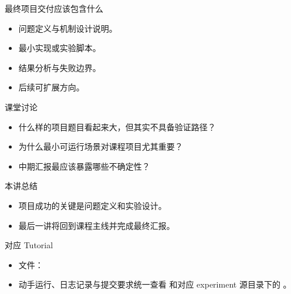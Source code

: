 \begin{frame}{最终项目交付应该包含什么}
  \begin{itemize}
    \item 问题定义与机制设计说明。
    \item 最小实现或实验脚本。
    \item 结果分析与失败边界。
    \item 后续可扩展方向。
  \end{itemize}
\end{frame}



\begin{frame}{课堂讨论}
  \begin{itemize}
    \item 什么样的项目题目看起来大，但其实不具备验证路径？
    \item 为什么最小可运行场景对课程项目尤其重要？
    \item 中期汇报最应该暴露哪些不确定性？
  \end{itemize}
\end{frame}

\begin{frame}{本讲总结}
  \begin{itemize}
    \item 项目成功的关键是问题定义和实验设计。
    \item 最后一讲将回到课程主线并完成最终汇报。
  \end{itemize}
\end{frame}

\LectureThirteenSources

\begin{frame}{对应 Tutorial}
  \begin{itemize}
    \item 文件：\texttt{}
    \item 动手运行、日志记录与提交要求统一查看 \texttt{} 和对应 experiment 源目录下的 \texttt{}。
  \end{itemize}
\end{frame}


